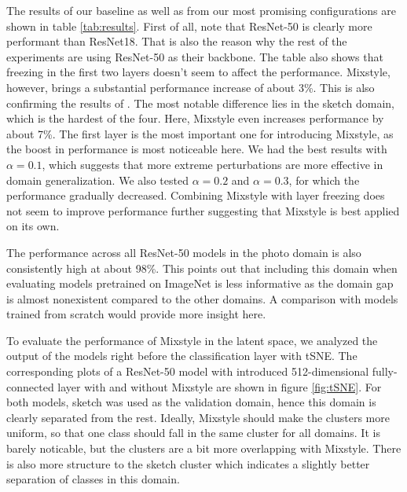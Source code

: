 The results of our baseline as well as from our most promising configurations are shown in table \ref{tab:results}. First of all, note that ResNet-50 is clearly more performant than ResNet18. That is also the reason why the rest of the experiments are using ResNet-50 as their backbone. The table also shows that freezing in the first two layers doesn't seem to affect the performance. Mixstyle, however, brings a substantial performance increase of about 3\%. This is also confirming the results of \cite{mixstyle_ref}. The most notable difference lies in the sketch domain, which is the hardest of the four. Here, Mixstyle even increases performance by about 7\%. The first layer is the most important one for introducing Mixstyle, as the boost in performance is most noticeable here. We had the best results with $\alpha = 0.1$, which suggests that more extreme perturbations are more effective in domain generalization. We also tested $\alpha = 0.2$ and $\alpha = 0.3$, for which the performance gradually decreased. Combining Mixstyle with layer freezing does not seem to improve performance further suggesting that Mixstyle is best applied on its own.

The performance across all ResNet-50 models in the photo domain is also consistently high at about 98\%. This points out that including this domain when evaluating models pretrained on ImageNet is less informative as the domain gap is almost nonexistent compared to the other domains. A comparison with models trained from scratch would provide more insight here.

To evaluate the performance of Mixstyle in the latent space, we analyzed the output of the models right before the classification layer with tSNE. The corresponding plots of a ResNet-50 model with introduced 512-dimensional fully-connected layer with and without Mixstyle are shown in figure \ref{fig:tSNE}. For both models, sketch was used as the validation domain, hence this domain is clearly separated from the rest. Ideally, Mixstyle should make the clusters more uniform, so that one class should fall in the same cluster for all domains. It is barely noticable, but the clusters are a bit more overlapping with Mixstyle. There is also more structure to the sketch cluster which indicates a slightly better separation of classes in this domain.

